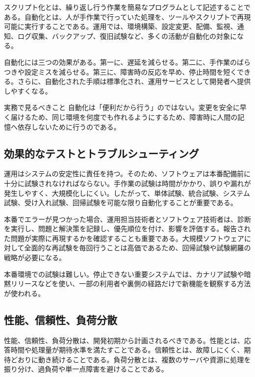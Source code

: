 \documentclass[uplatex,dvipdfmx,a4paper,10pt]{jsarticle}
\begin{document}
スクリプト化とは、繰り返し行う作業を簡易なプログラムとして記述することである。自動化とは、人が手作業で行っていた処理を、ツールやスクリプトで再現可能に実行することである。運用では、環境構築、設定変更、配備、監視、通知、ログ収集、バックアップ、復旧試験など、多くの活動が自動化の対象になる。

自動化には三つの効果がある。第一に、遅延を減らせる。第二に、手作業のばらつきや設定ミスを減らせる。第三に、障害時の反応を早め、停止時間を短くできる。さらに、自動化された手順は標準化され、運用サービスとして開発者へ提供しやすくなる。

\begin{pointbox}{実務で見るべきこと}
自動化は「便利だから行う」のではない。変更を安全に早く届けるため、同じ環境を何度でも作れるようにするため、障害時に人間の記憶へ依存しないために行うのである。
\end{pointbox}

\subsection{効果的なテストとトラブルシューティング}

運用はシステムの安定性に責任を持つ。そのため、ソフトウェアは本番配備前に十分に試験されなければならない。手作業の試験は時間がかかり、誤りや漏れが発生しやすく、大規模化しにくい。したがって、単体試験、統合試験、システム試験、受け入れ試験、回帰試験を可能な限り自動化することが重要である。

本番でエラーが見つかった場合、運用担当技術者とソフトウェア技術者は、診断を実行し、問題と解決策を記録し、優先順位を付け、影響を評価する。報告された問題が実際に再現するかを確認することも重要である。大規模ソフトウェアに対して全面的な再試験を毎回行うことは高価であるため、回帰試験や試験網羅の戦略が必要になる。

本番環境での試験は難しい。停止できない重要システムでは、カナリア試験や暗黙リリースなどを使い、一部の利用者や裏側の経路だけで新機能を観察する方法が使われる。

\subsection{性能、信頼性、負荷分散}

性能、信頼性、負荷分散は、開発初期から計画されるべきである。性能とは、応答時間や処理量が期待水準を満たすことである。信頼性とは、故障しにくく、期待どおりに動き続けることである。負荷分散とは、複数のサーバや資源に処理を振り分け、過負荷や単一点障害を避けることである。
\end{document}
